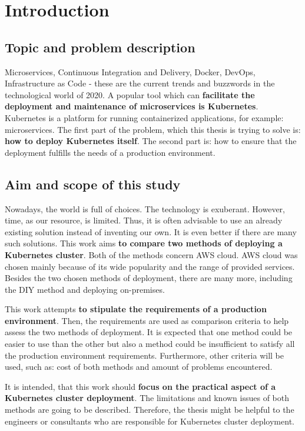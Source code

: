 \section{Introduction}


\subsection{Topic and problem description}

Microservices, Continuous Integration and Delivery, Docker, DevOps, Infrastructure as Code - these are the current trends and buzzwords in the technological world of 2020. A popular tool which can \textbf{facilitate the deployment and maintenance of microservices is Kubernetes}. Kubernetes is a platform for running containerized applications, for example: microservices. The first part of the problem, which this thesis is trying to solve is: \textbf{how to deploy Kubernetes itself}. The second part is: how to ensure that the deployment fulfills the needs of a production environment.


\subsection{Aim and scope of this study}


Nowadays, the world is full of choices. The technology is exuberant. However, time, as our resource, is limited. Thus, it is often advisable to use an already existing solution instead of inventing our own. It is even better if there are many such solutions. This work aims \textbf{to compare two methods of deploying a Kubernetes cluster}. Both of the methods concern AWS cloud. AWS cloud was chosen mainly because of its wide popularity and the range of provided services. Besides the two chosen methods of deployment, there are many more, including the DIY method and deploying on-premises.

This work attempts \textbf{to stipulate the requirements of a production environment}. Then, the requirements are used as comparison criteria to help assess the two methods of deployment. It is expected that one method could be easier to use than the other but also a method could be insufficient to satisfy all the production environment requirements. Furthermore, other criteria will be used, such as: cost of both methods and amount of problems encountered.

It is intended, that this work should \textbf{focus on the practical aspect of a Kubernetes cluster deployment}. The limitations and known issues of both methods are going to be described. Therefore, the thesis might be helpful to the engineers or consultants who are responsible for Kubernetes cluster deployment.

